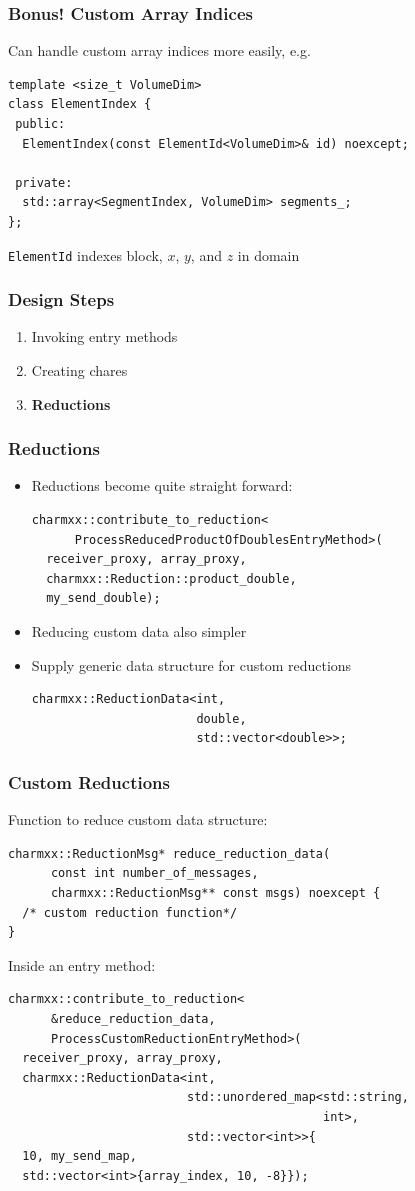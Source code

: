 \documentclass[svgnames,tikz,serif,ragged2e]{beamer}
\begin{document}
\begin{frame}[fragile]
  \frametitle{Bonus! Custom Array Indices}
  Can handle custom array indices more easily, e.g.
\begin{lstlisting}
template <size_t VolumeDim>
class ElementIndex {
 public:
  ElementIndex(const ElementId<VolumeDim>& id) noexcept;

 private:
  std::array<SegmentIndex, VolumeDim> segments_;
};
\end{lstlisting}
  \texttt{ElementId} indexes block, $x$, $y$, and $z$ in domain
\end{frame}

\begin{frame}[noframenumbering]
  \frametitle{Design Steps}
  \begin{enumerate}
  \item Invoking entry methods
  \item Creating chares
  \item \textbf{Reductions}
  \end{enumerate}
\end{frame}

\begin{frame}
  \frametitle{Reductions}
  \begin{itemize}
  \item<1-> Reductions become quite straight forward:
\begin{lstlisting}
charmxx::contribute_to_reduction<
      ProcessReducedProductOfDoublesEntryMethod>(
  receiver_proxy, array_proxy,
  charmxx::Reduction::product_double,
  my_send_double);
\end{lstlisting}
  \item<2-> Reducing custom data also simpler
  \item<2-> Supply generic data structure for custom reductions
\begin{lstlisting}
charmxx::ReductionData<int,
                       double,
                       std::vector<double>>;
\end{lstlisting}
  \end{itemize}
\end{frame}

\begin{frame}[fragile]
  \frametitle{Custom Reductions}
  Function to reduce custom data structure:
\begin{lstlisting}
charmxx::ReductionMsg* reduce_reduction_data(
      const int number_of_messages,
      charmxx::ReductionMsg** const msgs) noexcept {
  /* custom reduction function*/
}
\end{lstlisting}

  \pause
  Inside an entry method:
\begin{lstlisting}
charmxx::contribute_to_reduction<
      &reduce_reduction_data,
      ProcessCustomReductionEntryMethod>(
  receiver_proxy, array_proxy,
  charmxx::ReductionData<int,
                         std::unordered_map<std::string,
                                            int>,
                         std::vector<int>>{
  10, my_send_map,
  std::vector<int>{array_index, 10, -8}});
\end{lstlisting}
\end{frame}
\end{document}
